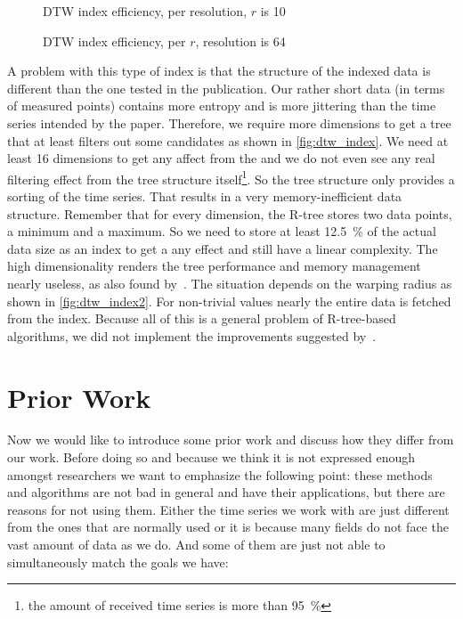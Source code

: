 \begin{figure}
    \centering
    
    \caption{DTW index efficiency, per resolution, $r$ is \num{10}}\label{fig:dtw_index}
\end{figure}

\begin{figure}
    \centering
    
    \caption{DTW index efficiency, per $r$, resolution is \num{64}}\label{fig:dtw_index2}
\end{figure}

A problem with this type of index is that the structure of the indexed data is different than the one tested in the publication. Our rather short data (in terms of measured points) contains more entropy and is more jittering than the time series intended by the paper. Therefore, we require more dimensions to get a tree that at least filters out some candidates as shown in \autoref{fig:dtw_index}. We need at least \num{16} dimensions to get any affect from the  and we do not even see any real filtering effect from the tree structure itself\footnote{the amount of received time series is more than \SI{95}{\percent}}. So the tree structure only provides a sorting of the time series. That results in a very memory-inefficient data structure. Remember that for every dimension, the R-tree stores two data points, a minimum and a maximum. So we need to store at least \SI{12.5}{\percent} of the actual data size as an index to get a any effect and still have a linear complexity. The high dimensionality renders the tree performance and memory management nearly useless, as also found by~\cite{rtree_highdim}. The situation depends on the warping radius as shown in \autoref{fig:dtw_index2}. For non-trivial values nearly the entire data is fetched from the index. Because all of this is a general problem of R-tree-based algorithms, we did not implement the improvements suggested by~\cite{LB_Improved}.



\section{Prior Work}
\label{sec:baseline:prior}

Now we would like to introduce some prior work and discuss how they differ from our work. Before doing so and because we think it is not expressed enough amongst researchers we want to emphasize the following point: these methods and algorithms are not bad in general and have their applications, but there are reasons for not using them. Either the time series we work with are just different from the ones that are normally used or it is because many fields do not face the vast amount of data as we do. And some of them are just not able to simultaneously match the goals we have:


